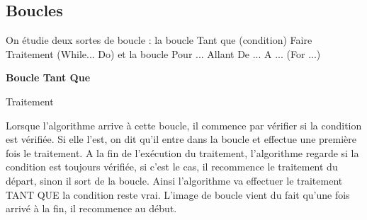 \subsection{Boucles}
On étudie deux sortes de boucle : la boucle Tant que (condition) Faire Traitement (While... Do) et la boucle Pour ... Allant De ... A ... (For ...) \newline

\textbf{Boucle Tant Que}\newline
\begin{algobox}
\DebutAlgo
{}
\DebutTantQue
\Ligne Traitement
\FinTantQue
\FinAlgo
\end{algobox}
Lorsque l'algorithme arrive à cette boucle, il commence par vérifier si la condition est vérifiée. Si elle l'est, on dit qu'il entre dans la boucle et effectue une première fois le traitement. A la fin de l'exécution du traitement, l'algorithme regarde si la condition est toujours vérifiée, si c'est le cas, il recommence le traitement du départ, sinon il sort de la boucle. Ainsi l'algorithme va effectuer le traitement TANT QUE la condition reste vrai. L'image de boucle vient du fait qu'une fois arrivé à la fin, il recommence au début. \newline


